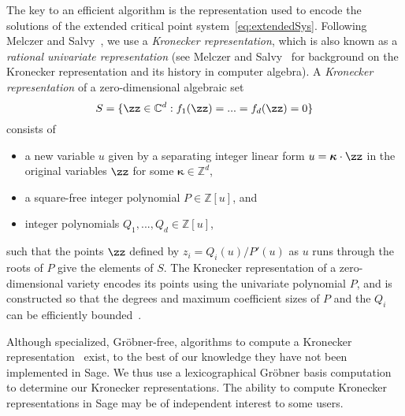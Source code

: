 \documentclass[a4paper]{amsart}
\theoremstyle{definition}
\newcommand{\Z}{{\mathbb Z}}
\begin{document}
The key to an efficient algorithm is the representation used to encode the solutions of the extended critical point system~\eqref{eq:extendedSys}. Following Melczer and Salvy~\cite{MelczerSalvy2021}, we use a \emph{Kronecker representation}, which is also known as a \emph{rational univariate representation} (see Melczer and Salvy~\cite{MelczerSalvy2021} for background on the Kronecker representation and its history in computer algebra). A \emph{Kronecker representation} of a zero-dimensional algebraic set 
\[ S = \{\zz \in \mathbb{C}^d : f_1(\zz) = ... = f_d(\zz) = 0\}\] 
consists of
\begin{itemize}
    \item a new variable $u$ given by a separating integer linear form 
    $u = \boldsymbol{\kappa} \cdot \zz$ in the original variables $\zz$ for some $\boldsymbol{\kappa}\in \mathbb{Z}^d$,
    \item a square-free integer polynomial $P \in \Z[u]$, and
    \item integer polynomials $Q_1, ..., Q_d \in \Z[u]$,
\end{itemize}
such that the points $\zz$ defined by $z_i=Q_i(u)/P'(u)$ as $u$ runs through the roots of $P$ give the elements of $S$. The Kronecker representation of a zero-dimensional variety encodes its points using the univariate polynomial $P$, and is constructed so that the degrees and maximum coefficient sizes of $P$ and the $Q_i$ can be efficiently bounded~\cite{Safey-El-DinSchost2018,Schost2001}.

Although specialized, Gröbner-free, algorithms to compute a Kronecker representation~\cite{GiustiLecerfSalvy2001} exist, to the best of our knowledge they have not been implemented in Sage. We thus use a lexicographical Gröbner basis computation to determine our Kronecker representations. The ability to compute Kronecker representations in Sage may be of independent interest to some users.
\end{document}
